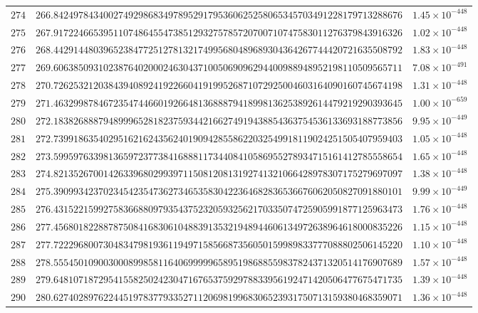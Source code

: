 \documentclass[12pt,reqno]{amsart}
\theoremstyle{remark}
\begin{document}
\begin{longtable}{clc}
$274$ & $266.8424978434002749298683497895291795360625258065345703491228179713288676$ & $1.45\times 10^{-448}$ \\
$275$ & $267.9172246653951107486455473851293275785720700710747583011276379843916326$ & $1.02\times 10^{-448}$ \\
$276$ & $268.4429144803965238477251278132174995680489689304364267744420721635508792$ & $1.83\times 10^{-448}$ \\
$277$ & $269.6063850931023876402000246304371005069096294400988948952198110509565711$ & $7.08\times 10^{-491}$ \\
$278$ & $270.7262532120384394089241922660419199526871072925004603164090160745674198$ & $1.31\times 10^{-448}$ \\
$279$ & $271.4632998784672354744660192664813688879418998136253892614479219290393645$ & $1.00\times 10^{-659}$ \\
$280$ & $272.1838268887948999652818237593442166274919438854363754536133693188773856$ & $9.95\times 10^{-449}$ \\
$281$ & $272.7399186354029516216243562401909428558622032549918119024251505407959403$ & $1.05\times 10^{-448}$ \\
$282$ & $273.5995976339813659723773841688811734408410586955278934715161412785558654$ & $1.65\times 10^{-448}$ \\
$283$ & $274.8213526700142633968029939711508120813192741321066428978307175279697097$ & $1.38\times 10^{-448}$ \\
$284$ & $275.3909934237023454235473627346535830422364682836536676062050827091880101$ & $9.99\times 10^{-449}$ \\
$285$ & $276.4315221599275836688097935437523205932562170335074725905991877125963473$ & $1.76\times 10^{-448}$ \\
$286$ & $277.4568018228878750841683061048839135321948944606134972638964618000835226$ & $1.15\times 10^{-448}$ \\
$287$ & $277.7222968007304834798193611949715856687356050159989833777088802506145220$ & $1.10\times 10^{-448}$ \\
$288$ & $278.5554501090030008998581164069999965895198688559837824371320514176907689$ & $1.57\times 10^{-448}$ \\
$289$ & $279.6481071872954155825024230471676537592978833956192471420506477675471735$ & $1.39\times 10^{-448}$ \\
$290$ & $280.6274028976224451978377933527112069819968306523931750713159380468359071$ & $1.36\times 10^{-448}$ \\

\end{longtable}
\end{document}
